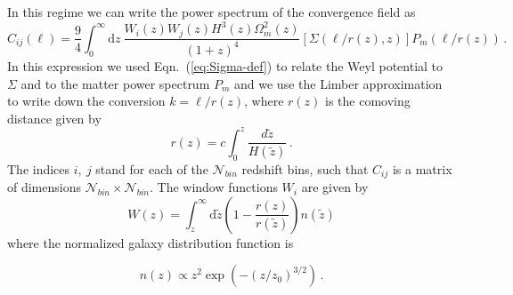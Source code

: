 In this regime we can write the power spectrum of the convergence field as
\begin{equation}
\label{def_shear}
C_{ij}(\ell)=\frac{9}{4}\int_{0}^{\infty}\mbox{d}z\:\frac{W_{i}(z)W_{j}(z)H^{3}(z)\Omega_{m}^{2}(z)}{(1+z)^{4}}\left[\Sigma(\ell/r(z),z)\right]P_{m}(\ell/r(z)) \, .
\end{equation}
In this expression we used Eqn.\ (\ref{eq:Sigma-def}) to relate the Weyl potential to $\Sigma$ and
to the matter power spectrum $P_m$ and we use the Limber approximation to write down the conversion $k=\ell/r(z)$, where $r(z)$ is the comoving
distance given by
\begin{equation}
r(z) = c\int_0^z \frac{d\tilde{z}}{H(\tilde{z})} \, .
\end{equation}
The indices $i,\:j$ stand for each of the $\mathcal{N}_{bin}$
redshift bins, such that $C_{ij}$ is a matrix of dimensions $\mathcal{N}_{bin}\times\mathcal{N}_{bin}$. The window functions $W_i$ are given by
\begin{equation}
W(z)=\int_{z}^{\infty}\mbox{d}\tilde{z}\left(1-\frac{r(z)}{r(\tilde{z})}\right)n(\tilde{z})
\end{equation}
where the normalized galaxy distribution function is

\begin{equation}
n(z)\propto z^{2}\exp\left(-(z/z_{0})^{3/2}\right) \, . \label{eq:ngal dist}
\end{equation}

